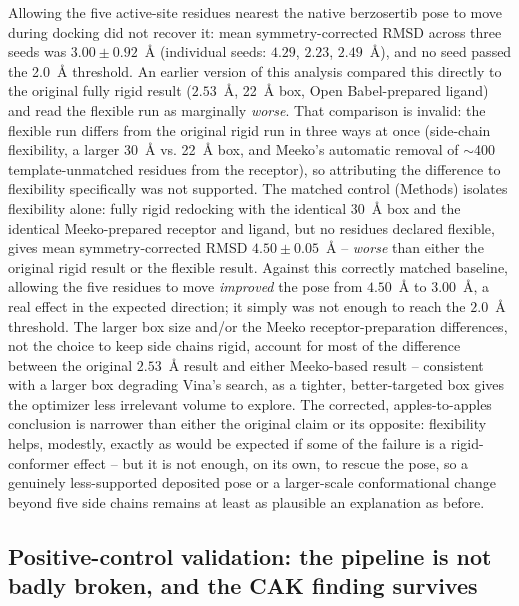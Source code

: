 \documentclass[11pt]{article}
\begin{document}
Allowing the five active-site residues nearest the native berzosertib
pose to move during docking did not recover it: mean symmetry-corrected
RMSD across three seeds was $3.00\pm0.92$~{\AA} (individual seeds:
$4.29$, $2.23$, $2.49$~{\AA}), and no seed passed the 2.0~{\AA} threshold.
An earlier version of this analysis compared this directly to the
original fully rigid result ($2.53$~{\AA}, 22~{\AA} box, Open
Babel-prepared ligand) and read the flexible run as marginally
\emph{worse}. That comparison is invalid: the flexible run differs from
the original rigid run in three ways at once (side-chain flexibility, a
larger 30~{\AA} vs. 22~{\AA} box, and Meeko's automatic removal of
$\sim$400 template-unmatched residues from the receptor), so attributing
the difference to flexibility specifically was not supported. The matched
control (Methods) isolates flexibility alone: fully rigid redocking with
the identical 30~{\AA} box and the identical Meeko-prepared receptor and
ligand, but no residues declared flexible, gives mean symmetry-corrected
RMSD $4.50\pm0.05$~{\AA} -- \emph{worse} than either the original rigid
result or the flexible result. Against this correctly matched baseline,
allowing the five residues to move \emph{improved} the pose from
$4.50$~{\AA} to $3.00$~{\AA}, a real effect in the expected direction; it
simply was not enough to reach the $2.0$~{\AA} threshold. The larger box
size and/or the Meeko receptor-preparation differences, not the choice to
keep side chains rigid, account for most of the difference between the
original $2.53$~{\AA} result and either Meeko-based result -- consistent
with a larger box degrading Vina's search, as a tighter, better-targeted
box gives the optimizer less irrelevant volume to explore. The corrected,
apples-to-apples conclusion is narrower than either the original claim or
its opposite: flexibility helps, modestly, exactly as would be expected if
some of the failure is a rigid-conformer effect -- but it is not enough,
on its own, to rescue the pose, so a genuinely less-supported deposited
pose or a larger-scale conformational change beyond five side chains
remains at least as plausible an explanation as before.

\subsection*{Positive-control validation: the pipeline is not badly
broken, and the CAK finding survives}
\end{document}
